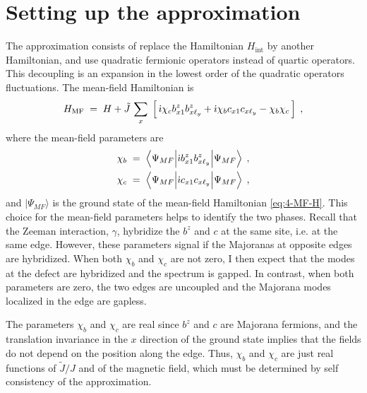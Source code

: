 \section{Setting up the approximation}
The approximation consists of replace the Hamiltonian $H_{\text{int}}$ by another Hamiltonian, and use quadratic fermionic operators instead of quartic operators. %
This decoupling is an expansion in the lowest order of the quadratic operators fluctuations.
The mean-field Hamiltonian is 
\begin{equation}
    H_{\text{MF}} \; = \; H+ \tilde{J} \, \sum_{x} \; \left[ \, \dot{\imath} \chi_c b^{z}_{x1}b_{x\ell_y}^{z} + \dot{\imath} \chi_b c_{x1}c_{x\ell_y}  - \chi_b\chi_c \, \right]\;, \label{eq:4-MF-H}
\end{equation}
where the mean-field parameters are 
\begin{align}
\begin{split}
    \chi_b \; &= \; \left\langle \Psi_{MF} \Big\vert \dot{\imath}  b^{z}_{x1}b_{x\ell_y}^{z} \Big\vert  \Psi_{MF} \right\rangle\; , \\
    \chi_c \; &= \; \left\langle \Psi_{MF} \Big\vert  \dot{\imath} c_{x1} c_{x\ell_y}  \Big\vert  \Psi_{MF} \right\rangle\; ,
    \end{split} \label{eq:4-MF-field}
\end{align}
and $\vert  \Psi_{MF} \rangle$ is the ground state of the mean-field Hamiltonian \eqref{eq:4-MF-H}. This choice for the mean-field parameters helps to identify the two phases. Recall that the Zeeman interaction, $\gamma$, hybridize the $b^z$ and $c$ at the same site, i.e. at the same edge. However, these parameters signal if the Majoranas at opposite edges are hybridized. When both $\chi_b$ and $\chi_c$ are not zero, I then expect that the modes at the defect are hybridized and the spectrum is gapped. In contrast, when both parameters are zero, the two edges are uncoupled and the Majorana modes localized in the edge are gapless. 


The parameters $  \chi_b$ and $  \chi_c$ are real since $b^z$ and $c$ are Majorana fermions, and the translation invariance in the $x$ direction of the ground state implies that the fields do not depend on the position along the edge. Thus, $\chi_b$ and $\chi_c$ are just real functions of $\tilde{J}/J$ and of the magnetic field, which must be determined by self consistency of the approximation.

